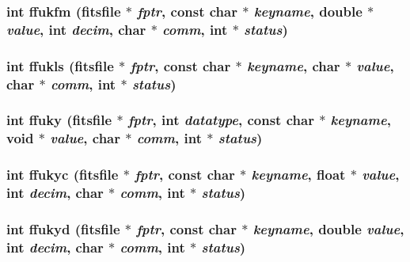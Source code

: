 \subsubsection{\setlength{\rightskip}{0pt plus 5cm}int ffukfm (\bf{fitsfile} $\ast$ {\em fptr}, const char $\ast$ {\em keyname}, double $\ast$ {\em value}, int {\em decim}, char $\ast$ {\em comm}, int $\ast$ {\em status})}\label{fitsio_8h_c26ad2e4d827639f834233229cf99ccb}


\subsubsection{\setlength{\rightskip}{0pt plus 5cm}int ffukls (\bf{fitsfile} $\ast$ {\em fptr}, const char $\ast$ {\em keyname}, char $\ast$ {\em value}, char $\ast$ {\em comm}, int $\ast$ {\em status})}\label{fitsio_8h_395b4140820c02fa55e498ddd6d95943}


\subsubsection{\setlength{\rightskip}{0pt plus 5cm}int ffuky (\bf{fitsfile} $\ast$ {\em fptr}, int {\em datatype}, const char $\ast$ {\em keyname}, void $\ast$ {\em value}, char $\ast$ {\em comm}, int $\ast$ {\em status})}\label{fitsio_8h_a402f603cec33c59a9b6dec08dc7d35e}


\subsubsection{\setlength{\rightskip}{0pt plus 5cm}int ffukyc (\bf{fitsfile} $\ast$ {\em fptr}, const char $\ast$ {\em keyname}, float $\ast$ {\em value}, int {\em decim}, char $\ast$ {\em comm}, int $\ast$ {\em status})}\label{fitsio_8h_ded0f88f0f2938fd23a49b55afd453c4}


\subsubsection{\setlength{\rightskip}{0pt plus 5cm}int ffukyd (\bf{fitsfile} $\ast$ {\em fptr}, const char $\ast$ {\em keyname}, double {\em value}, int {\em decim}, char $\ast$ {\em comm}, int $\ast$ {\em status})}\label{fitsio_8h_07915bf0e4579bc324d213671d1d6f32}


